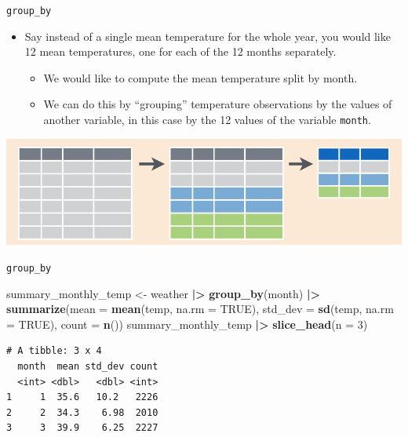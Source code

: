 \documentclass[
  ignorenonframetext,
]{beamer}
\newenvironment{Shaded}{\begin{snugshade}}{\end{snugshade}}
\newcommand{\AttributeTok}[1]{\textcolor[rgb]{0.13,0.29,0.53}{#1}}
\newcommand{\ConstantTok}[1]{\textcolor[rgb]{0.56,0.35,0.01}{#1}}
\newcommand{\DecValTok}[1]{\textcolor[rgb]{0.00,0.00,0.81}{#1}}
\newcommand{\FunctionTok}[1]{\textcolor[rgb]{0.13,0.29,0.53}{\textbf{#1}}}
\newcommand{\NormalTok}[1]{#1}
\newcommand{\OtherTok}[1]{\textcolor[rgb]{0.56,0.35,0.01}{#1}}
\newcommand{\SpecialCharTok}[1]{\textcolor[rgb]{0.81,0.36,0.00}{\textbf{#1}}}
\providecommand{\tightlist}{%
  \setlength{\itemsep}{0pt}\setlength{\parskip}{0pt}}
\begin{document}
\begin{frame}[fragile]{\texttt{group\_by}}
\protect\hypertarget{group_by}{}
\begin{itemize}
\item
  Say instead of a single mean temperature for the whole year, you would
  like 12 mean temperatures, one for each of the 12 months separately.

  \begin{itemize}
  \tightlist
  \item
    We would like to compute the mean temperature split by month.
  \item
    We can do this by ``grouping'' temperature observations by the
    values of another variable, in this case by the 12 values of the
    variable \texttt{month}.
  \end{itemize}
\end{itemize}

\begin{center}\includegraphics[width=0.8\linewidth,height=0.4\textheight]{week3_3} \end{center}
\end{frame}

\begin{frame}[fragile]{\texttt{group\_by}}
\protect\hypertarget{group_by-1}{}
\normalsize

\begin{Shaded}
\begin{Highlighting}[]
\NormalTok{summary\_monthly\_temp }\OtherTok{\textless{}{-}}\NormalTok{ weather }\SpecialCharTok{|\textgreater{}} 
  \FunctionTok{group\_by}\NormalTok{(month) }\SpecialCharTok{|\textgreater{}} 
  \FunctionTok{summarize}\NormalTok{(}\AttributeTok{mean =} \FunctionTok{mean}\NormalTok{(temp, }\AttributeTok{na.rm =} \ConstantTok{TRUE}\NormalTok{), }
            \AttributeTok{std\_dev =} \FunctionTok{sd}\NormalTok{(temp, }\AttributeTok{na.rm =} \ConstantTok{TRUE}\NormalTok{),}
            \AttributeTok{count =} \FunctionTok{n}\NormalTok{())}
\NormalTok{summary\_monthly\_temp }\SpecialCharTok{|\textgreater{}} 
  \FunctionTok{slice\_head}\NormalTok{(}\AttributeTok{n =} \DecValTok{3}\NormalTok{)}
\end{Highlighting}
\end{Shaded}

\begin{verbatim}
# A tibble: 3 x 4
  month  mean std_dev count
  <int> <dbl>   <dbl> <int>
1     1  35.6   10.2   2226
2     2  34.3    6.98  2010
3     3  39.9    6.25  2227
\end{verbatim}

\normalsize
\end{frame}
\end{document}
